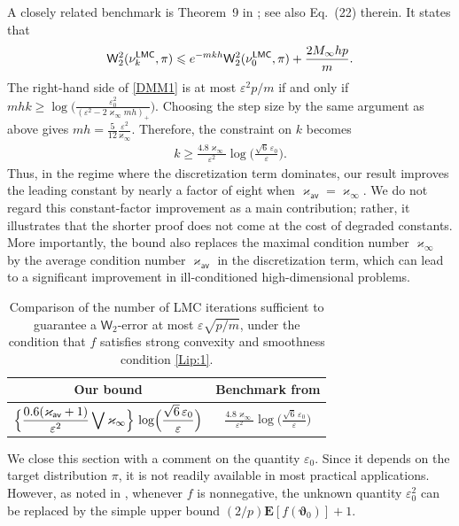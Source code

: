 \documentclass[aos,reqno]{imsart}
\newcommand\bvartheta{\boldsymbol\vartheta}
\def\wass{\mathsf{W}}
\def\kappav{\varkappa_{\textsf{av}}}
\def\kappamax{\varkappa_{\infty}}
\def\Mmax{M_{\infty}}
\theoremstyle{definition}
\begin{document}
A closely related benchmark is Theorem~9 in 
\cite{durmus2019analysis}; see also Eq.~(22) therein. 
It states that
\begin{align}\label{DMM1}
    \wass_2^2(\nu^{\sf LMC}_{k}, \pi) 
    \leqslant e^{-mkh}\wass_2^2(\nu^{\sf LMC}_0, \pi)
    + \frac{2\Mmax hp}{m}.
\end{align}
The right-hand side of \eqref{DMM1} is at most 
$\varepsilon^2p/m$ if and only if $mhk\geqslant 
\log\big(\frac{\varepsilon_0^2} {(\varepsilon^2 - 
2\kappamax mh)_+}\big)$. Choosing the step size by 
the same argument as above gives $mh = \frac{5}{12}
\frac{\varepsilon^2}{\kappamax}$. Therefore, the 
constraint on $k$ becomes
\begin{align}
    k\geqslant \frac{4.8\kappamax}{\varepsilon^2}
    \log\Big(\frac{\sqrt{6}\,\varepsilon_0}{
    \varepsilon}\Big).
\end{align}
Thus, in the regime where the discretization term 
dominates, our result improves the leading constant 
by nearly a factor of eight when $\kappav=\kappamax$. 
We do not regard this constant-factor improvement 
as a main contribution; rather, it illustrates that 
the shorter proof does not come at the cost of 
degraded constants. More importantly, the bound also
replaces the maximal condition number $\kappamax$ 
by the average condition number $\kappav$ in the 
discretization term, which can lead to a significant 
improvement in ill-conditioned high-dimensional 
problems.
\begin{table}[t]
    \centering
    \begin{tabular}{cc}
    \toprule
    Our bound & Benchmark from \cite{durmus2019analysis}
    \\
    \midrule
    $\displaystyle\Big\{\frac{0.6(\kappav +1)}{
    \varepsilon^2} \bigvee {\kappamax}\Big\}\,\log 
    \Bigl(\frac{\sqrt{6}\,\varepsilon_0}{\varepsilon}
    \Bigr)$ 
    &
    $\displaystyle\frac{4.8\kappamax}{\varepsilon^2}
    \log\Big(\frac{\sqrt{6}\,\varepsilon_0}{
    \varepsilon}\Big)$
    \\
    \bottomrule
    \end{tabular}
    \caption{Comparison of the number of LMC iterations
    sufficient to guarantee a $\wass_2$-error at most
    $\varepsilon\sqrt{p/m}$, under the condition that
    $f$ satisfies strong convexity and smoothness 
    condition \eqref{Lip:1}.}
    \label{tab:lmc-mixing-comparison}
\end{table}
We close this section with a comment on the quantity
$\varepsilon_0$. Since it depends on the target
distribution $\pi$, it is not readily available in most
practical applications. However, as noted in 
\citep[Remark 2.1]{dalalyan2019user}, whenever $f$ is
nonnegative, the unknown quantity $\varepsilon_0^2$ can
be replaced by the simple upper bound $(2/p)\mathbf E 
[f(\bvartheta_0)] + 1$. 
\end{document}
